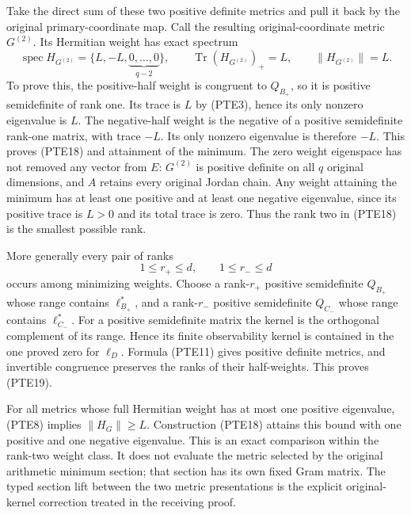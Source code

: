 Take the direct sum of these two positive definite metrics and pull
it back by the original primary-coordinate map.  Call the resulting
original-coordinate metric \(G^{(2)}\).  Its Hermitian weight has
exact spectrum
\begin{equation}\tag{PTE18}\label{eq:pte18}
 \operatorname{spec}H_{G^{(2)}}
 =\{L,-L,\underbrace{0,\ldots,0}_{q-2}\},
 \qquad \operatorname{Tr}(H_{G^{(2)}})_+=L,
 \qquad \|H_{G^{(2)}}\|=L.
\end{equation}
To prove this, the positive-half weight is congruent to
\(Q_{B_+}\), so it is positive semidefinite of rank one.  Its trace
is \(L\) by (PTE3), hence its only nonzero eigenvalue is \(L\).
The negative-half weight is the negative of a positive semidefinite
rank-one matrix, with trace \(-L\).  Its only nonzero eigenvalue is
therefore \(-L\).  This proves (PTE18) and attainment of the minimum.
The zero weight eigenspace has not removed any vector from \(E\):
\(G^{(2)}\) is positive definite on all \(q\) original dimensions,
and \(A\) retains every original Jordan chain.  Any weight attaining
the minimum has at least one positive and at least one negative
eigenvalue, since its positive trace is \(L>0\) and its total trace is
zero.  Thus the rank two in (PTE18) is the smallest possible rank.

More generally every pair of ranks
\begin{equation}\tag{PTE19}\label{eq:pte19}
 1\leq r_+\leq d,\qquad 1\leq r_-\leq d
\end{equation}
occurs among minimizing weights.  Choose a rank-\(r_+\) positive
semidefinite \(Q_{B_+}\) whose range contains \(\ell_{B_+}^*\), and a
rank-\(r_-\) positive semidefinite \(Q_{C_-}\) whose range contains
\(\ell_{C_-}^*\).  For a positive semidefinite matrix the kernel is the
orthogonal complement of its range.  Hence its finite observability
kernel is contained in the one proved zero for \(\ell_D\).  Formula
(PTE11) gives positive definite metrics, and invertible congruence
preserves the ranks of their half-weights.  This proves (PTE19).

For all metrics whose full Hermitian weight has at most one positive
eigenvalue, (PTE8) implies \(\|H_G\|\geq L\).  Construction (PTE18)
attains this bound with one positive and one negative eigenvalue.
This is an exact comparison within the rank-two weight class.  It
does not evaluate the metric selected by the original arithmetic
minimum section; that section has its own fixed Gram matrix.  The
typed section lift between the two metric presentations is the
explicit original-kernel correction treated in the receiving proof.

